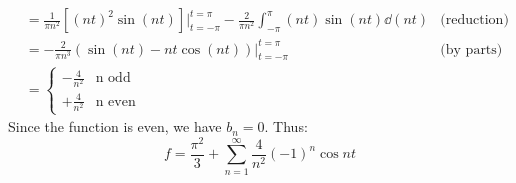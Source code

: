 \begin{itemize}
\begin{example}
\begin{align}
            &= \frac{1}{\pi n^2}\left[(nt)^2\sin(nt)\right]\Biggr|^{t=\pi}_{t=-\pi}-\frac{2}{\pi n^2}\int_{-\pi}^{\pi} (nt)\sin(nt)\dd{(nt)} & \text{(reduction)} \\ 
            &= -\frac{2}{\pi n^3}(\sin(nt)-nt\cos(nt))\Biggr|^{t=\pi}_{t=-\pi} & \text{(by parts)} \\ 
            &= \begin{cases}
                -\frac{4}{n^2} & \text{n odd} \\ 
                +\frac{4}{n^2} & \text{n even}
            \end{cases}
        \end{align}
        Since the function is even, we have $b_n=0$. Thus:
        \begin{equation}
            f = \frac{\pi^2}{3} + \sum_{n=1}^\infty \frac{4}{n^2}(-1)^{n} \cos nt
        \end{equation}
    \end{example}
\end{itemize}